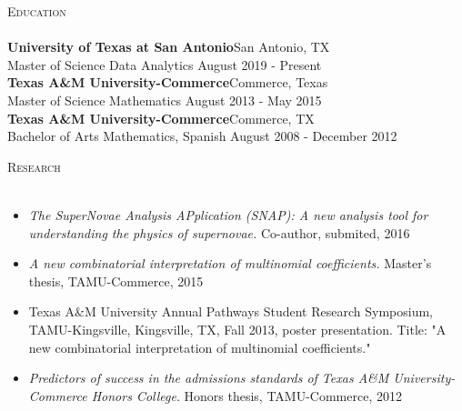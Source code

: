\documentclass[a4paper]{article}
\newcommand{\lineunder} {
    \vspace*{-8pt} \\
    \hspace*{-18pt} \hrulefill \\
}
\newcommand{\header} [1] {
    {\hspace*{-18pt}\vspace*{6pt} \textsc{#1}}
    \vspace*{-6pt} \lineunder
}
\begin{document}
\header{Education}
\textbf{University of Texas at San Antonio}\hfill San Antonio, TX\\
Master of Science Data Analytics \hfill August 2019 - Present\\
\vspace{2mm}
\textbf{Texas A\&M University-Commerce}\hfill Commerce, Texas\\
Master of Science Mathematics \hfill August 2013 - May 2015\\
\vspace{2mm}
\textbf{Texas A\&M University-Commerce}\hfill Commerce, TX\\
Bachelor of Arts Mathematics, Spanish \hfill August 2008 - December 2012\\
\vspace{2mm}

\header{Research}
\begin{itemize}
	\item \textit{The SuperNovae Analysis APplication (SNAP): A new analysis tool for understanding the physics of supernovae.} Co-author, submited, 2016
	\item \textit{A new combinatorial interpretation of multinomial coefficients.} Master's thesis, TAMU-Commerce, 2015
	\item Texas A\&M University Annual Pathways Student Research Symposium, TAMU-Kingsville, Kingsville, TX, Fall 2013, poster presentation. Title: "A new combinatorial interpretation of multinomial coefficients."
	\item \textit{Predictors of success in the admissions standards of Texas A\&M University-Commerce Honors College}. Honors thesis, TAMU-Commerce, 2012
\end{itemize}
\vspace{2mm}
\ 
\end{document}
